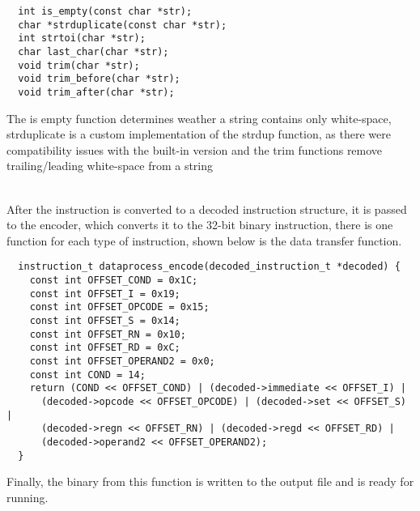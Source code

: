 \begin{verbatim}
  int is_empty(const char *str);
  char *strduplicate(const char *str);
  int strtoi(char *str);
  char last_char(char *str);
  void trim(char *str);
  void trim_before(char *str);
  void trim_after(char *str);
\end{verbatim} 

The is empty function determines weather a string contains only white-space, strduplicate is a custom implementation of the strdup function, as there were compatibility issues with the built-in version and the trim functions remove trailing/leading white-space from a string

~\\

After the instruction is converted to a decoded instruction structure, it is passed to the encoder, which converts it to the 32-bit binary instruction, there is one function for each type of instruction, shown below is the data transfer function.

\begin{verbatim}
  instruction_t dataprocess_encode(decoded_instruction_t *decoded) {
    const int OFFSET_COND = 0x1C;
    const int OFFSET_I = 0x19;
    const int OFFSET_OPCODE = 0x15;
    const int OFFSET_S = 0x14;
    const int OFFSET_RN = 0x10;
    const int OFFSET_RD = 0xC;
    const int OFFSET_OPERAND2 = 0x0;
    const int COND = 14;
    return (COND << OFFSET_COND) | (decoded->immediate << OFFSET_I) |
      (decoded->opcode << OFFSET_OPCODE) | (decoded->set << OFFSET_S) |
      (decoded->regn << OFFSET_RN) | (decoded->regd << OFFSET_RD) |
      (decoded->operand2 << OFFSET_OPERAND2);
  }
\end{verbatim}

Finally, the binary from this function is written to the output file and is ready for running.